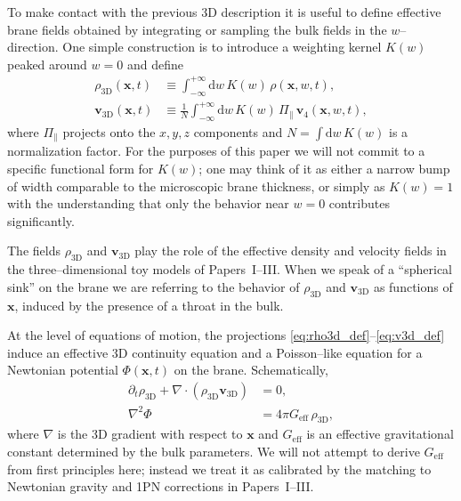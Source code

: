 \documentclass[12pt]{article}
\begin{document}
To make contact with the previous 3D description it is useful to define
effective brane fields obtained by integrating or sampling the bulk fields
in the $w$--direction.  One simple construction is to introduce a weighting
kernel $K(w)$ peaked around $w=0$ and define
\begin{align}
  \rho_{\mathrm{3D}}(\mathbf{x},t)
  &\equiv \int_{-\infty}^{+\infty} \mathrm{d}w\,
    K(w)\,\rho(\mathbf{x},w,t),
    \label{eq:rho3d_def}
  \\
  \mathbf{v}_{\mathrm{3D}}(\mathbf{x},t)
  &\equiv
    \frac{1}{N}
    \int_{-\infty}^{+\infty} \mathrm{d}w\,
    K(w)\,\Pi_{\parallel}\,\mathbf{v}_4(\mathbf{x},w,t),
    \label{eq:v3d_def}
\end{align}
where $\Pi_{\parallel}$ projects onto the $x,y,z$ components and
$N = \int \mathrm{d}w\,K(w)$ is a normalization factor.  For the purposes of
this paper we will not commit to a specific functional form for $K(w)$;
one may think of it as either a narrow bump of width comparable to the
microscopic brane thickness, or simply as $K(w)=1$ with the understanding
that only the behavior near $w=0$ contributes significantly.

The fields $\rho_{\mathrm{3D}}$ and $\mathbf{v}_{\mathrm{3D}}$ play the role
of the effective density and velocity fields in the three--dimensional toy
models of Papers~I--III.  When we speak of a ``spherical sink'' on the brane
we are referring to the behavior of $\rho_{\mathrm{3D}}$ and
$\mathbf{v}_{\mathrm{3D}}$ as functions of $\mathbf{x}$, induced by the
presence of a throat in the bulk.

At the level of equations of motion, the projections
\eqref{eq:rho3d_def}--\eqref{eq:v3d_def} induce an effective 3D continuity
equation and a Poisson--like equation for a Newtonian potential
$\Phi(\mathbf{x},t)$ on the brane.  Schematically,
\begin{align}
  \partial_t \rho_{\mathrm{3D}}
  + \nabla \cdot (\rho_{\mathrm{3D}}\mathbf{v}_{\mathrm{3D}})
  &= 0,
  \\
  \nabla^2 \Phi
  &= 4\pi G_{\mathrm{eff}}\,\rho_{\mathrm{3D}},
\end{align}
where $\nabla$ is the 3D gradient with respect to $\mathbf{x}$ and
$G_{\mathrm{eff}}$ is an effective gravitational constant determined by the
bulk parameters.  We will not attempt to derive $G_{\mathrm{eff}}$ from
first principles here; instead we treat it as calibrated by the matching to
Newtonian gravity and 1PN corrections in Papers~I--III.
\end{document}
